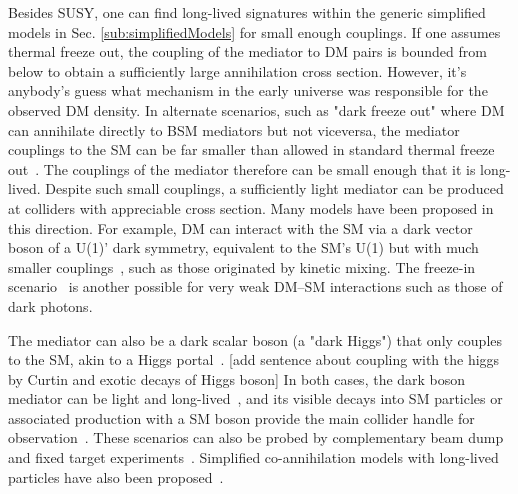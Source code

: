 Besides SUSY, one can find long-lived signatures within the generic simplified models in Sec. \ref{sub:simplifiedModels} for small enough couplings. If one assumes thermal freeze out, the coupling of the mediator to DM pairs is bounded from below to obtain a sufficiently large annihilation cross section. However, it's anybody's guess what mechanism in the early universe was responsible for the observed DM density. In alternate scenarios, such as "dark freeze out" where DM can annihilate directly to BSM mediators but not viceversa, the mediator couplings to the SM can be far smaller than allowed in standard thermal freeze out~\cite{Pospelov:2007mp,Das:2010ts}. The couplings of the mediator therefore can be small enough that it is long-lived. Despite such small couplings, a sufficiently light mediator can be produced at colliders with appreciable cross section. Many models have been proposed in this direction. For example, DM can interact with the SM via a dark vector boson of a U(1)' dark symmetry, equivalent to the SM's U(1) but with much smaller couplings~\cite{Holdom:1985ag}, such as those originated by kinetic mixing. The freeze-in scenario~\cite{Co:2015pka,Bernal:2017kxu} is another possible for very weak DM--SM interactions such as those of dark photons.

The mediator can also be a dark scalar boson (a "dark Higgs") that only couples to the SM, akin to a Higgs portal~\cite{Curtin:2014cca}. 
[add sentence about coupling with the higgs by Curtin and exotic decays of Higgs boson]
In both cases, the dark boson mediator can be light and long-lived~\cite{Pospelov:2007mp}, and its visible decays into SM particles or associated production with a SM boson provide the main collider handle for observation~\cite{Curtin:2014cca}.
These scenarios can also be probed by complementary beam dump and fixed target experiments~\cite{Battaglieri:2017aum}. %
Simplified co-annihilation models with long-lived particles have also been proposed~\cite{ElHedri:2017nny}. 

